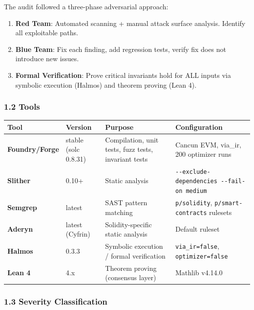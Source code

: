 \documentclass[
]{article}
\newcounter{none} %
\providecommand{\tightlist}{%
  \setlength{\itemsep}{0pt}\setlength{\parskip}{0pt}}
\begin{document}
The audit followed a three-phase adversarial approach:

\begin{enumerate}
\def\labelenumi{\arabic{enumi}.}
\tightlist
\item
  \textbf{Red Team}: Automated scanning + manual attack surface
  analysis. Identify all exploitable paths.
\item
  \textbf{Blue Team}: Fix each finding, add regression tests, verify fix
  does not introduce new issues.
\item
  \textbf{Formal Verification}: Prove critical invariants hold for ALL
  inputs via symbolic execution (Halmos) and theorem proving (Lean 4).
\end{enumerate}

\subsubsection{1.2 Tools}\label{12-tools}

{\def\LTcaptype{none} %
\begin{longtable}[]{@{}llll@{}}
\toprule\noalign{}
Tool & Version & Purpose & Configuration \\
\midrule\noalign{}
\endhead
\bottomrule\noalign{}
\endlastfoot
\textbf{Foundry/Forge} & stable (solc 0.8.31) & Compilation, unit tests,
fuzz tests, invariant tests & Cancun EVM, via\_ir, 200 optimizer runs \\
\textbf{Slither} & 0.10+ & Static analysis &
\texttt{-\/-exclude-dependencies\ -\/-fail-on\ medium} \\
\textbf{Semgrep} & latest & SAST pattern matching & \texttt{p/solidity},
\texttt{p/smart-contracts} rulesets \\
\textbf{Aderyn} & latest (Cyfrin) & Solidity-specific static analysis &
Default ruleset \\
\textbf{Halmos} & 0.3.3 & Symbolic execution / formal verification &
\texttt{via\_ir=false}, \texttt{optimizer=false} \\
\textbf{Lean 4} & 4.x & Theorem proving (consensus layer) & Mathlib
v4.14.0 \\
\end{longtable}
}

\subsubsection{1.3 Severity
Classification}\label{13-severity-classification}
\end{document}
